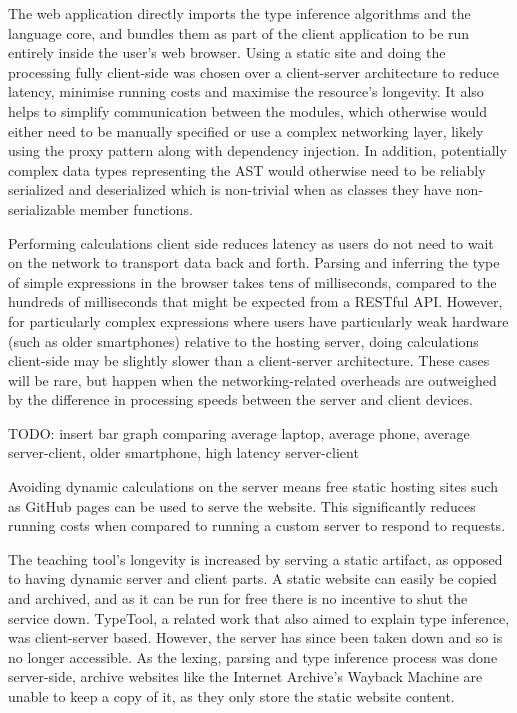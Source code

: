 \documentclass[a4paper,fleqn,twoside,12pt]{report}
\begin{document}
The web application directly imports the type inference algorithms and the language core, and bundles them as part of the client application to be run entirely inside the user’s web browser. Using a static site and doing the processing fully client-side was chosen over a client-server architecture to reduce latency, minimise running costs and maximise the resource’s longevity. It also helps to simplify communication between the modules, which otherwise would either need to be manually specified or use a complex networking layer, likely using the proxy pattern along with dependency injection. In addition, potentially complex data types representing the AST would otherwise need to be reliably serialized and deserialized which is non-trivial when as classes they have non-serializable member functions.

Performing calculations client side reduces latency as users do not need to wait on the network to transport data back and forth. Parsing and inferring the type of simple expressions in the browser takes tens of milliseconds, compared to the hundreds of milliseconds that might be expected from a RESTful API. However, for particularly complex expressions where users have particularly weak hardware (such as older smartphones) relative to the hosting server, doing calculations client-side may be slightly slower than a client-server architecture. These cases will be rare, but happen when the networking-related overheads are outweighed by the difference in processing speeds between the server and client devices.

TODO: insert bar graph comparing average laptop, average phone, average server-client, older smartphone, high latency server-client

Avoiding dynamic calculations on the server means free static hosting sites such as GitHub pages can be used to serve the website. This significantly reduces running costs when compared to running a custom server to respond to requests.

The teaching tool’s longevity is increased by serving a static artifact, as opposed to having dynamic server and client parts. A static website can easily be copied and archived, and as it can be run for free there is no incentive to shut the service down. TypeTool, a related work that also aimed to explain type inference, was client-server based. However, the server has since been taken down and so is no longer accessible. As the lexing, parsing and type inference process was done server-side, archive websites like the Internet Archive’s Wayback Machine are unable to keep a copy of it, as they only store the static website content.
\end{document}
